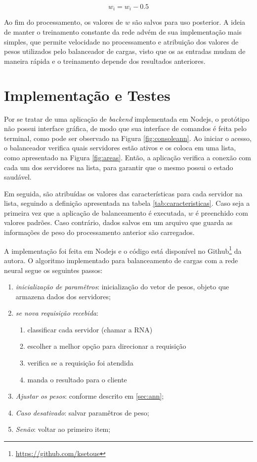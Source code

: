 \begin{equation}
w_i = w_i - 0.5
\label{eq:weight2}
\end{equation}

Ao fim do processamento, os valores de $w$ são salvos para uso posterior. A ideia de manter o treinamento constante da rede advém de sua implementação mais simples, que permite velocidade no processamento e atribuição dos valores de pesos utilizados pelo balanceador de cargas, visto que os as entradas mudam de maneira rápida e o treinamento depende dos resultados anteriores. 

\section{Implementação e Testes}\label{sec:testes}

Por se tratar de uma aplicação de \textit{backend} implementada em Nodejs, o protótipo não possui interface gráfica, de modo que sua interface de comandos é feita pelo terminal, como pode ser observado na Figura \ref{fig:consoleann}. Ao iniciar o acesso, o balanceador verifica quais servidores estão ativos e os coloca em uma lista, como apresentado na Figura \ref{fig:areas}. Então, a aplicação verifica a conexão com cada um dos servidores na lista, para garantir que o mesmo possui o estado saudável. 

Em seguida, são atribuídas os valores das características para cada servidor na lista, seguindo a definição apresentada na tabela \ref{tab:caracteristicas}. Caso seja a primeira vez que a aplicação de balanceamento é executada, $w$ é preenchido com valores padrões. Caso contrário, dados salvos em um arquivo que guarda as informações de peso do processamento anterior são carregados. 


A implementação foi feita em Nodejs e o código está disponível no Github\footnote{\url{https://github.com/ksetoue}} da autora. O algoritmo implementado para balanceamento de cargas com a rede neural segue os seguintes passos: 
\begin{enumerate}
	\item \textit{inicialização de paramêtros}: inicialização do vetor de pesos, objeto que armazena dados dos servidores;
	\item \textit{se nova requisição recebida}: 
	\begin{enumerate}
		\item classificar cada servidor (chamar a RNA)
		\item escolher a melhor opção para direcionar a requisição 
		\item verifica se a requisição foi atendida 
		\item manda o resultado para o cliente 			
	\end{enumerate}
	\item \textit{Ajustar os pesos}: conforme descrito em \ref{sec:ann};
	\item \textit{Caso desativado}: salvar paramêtros de peso; 
	\item \textit{Senão}: voltar ao primeiro item; 
\end{enumerate}

